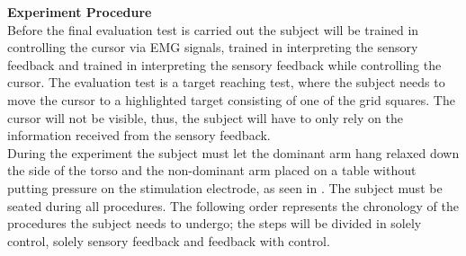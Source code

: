 \noindent\textbf{{\Large Experiment Procedure}} \\
\newline
Before the final evaluation test is carried out the subject will be trained in controlling the cursor via EMG signals, trained in interpreting the sensory feedback and trained in interpreting the sensory feedback while controlling the cursor. The evaluation test is a target reaching test, where the subject needs to move the cursor to a highlighted target consisting of one of the grid squares. The cursor will not be visible, thus, the subject will have to only rely on the information received from the sensory feedback. \\
During the experiment the subject must let the dominant arm hang relaxed down the side of the torso and the non-dominant arm placed on a table without putting pressure on the stimulation electrode, as seen in . The subject must be seated during all procedures. The following order represents the chronology of the procedures the subject needs to undergo; the steps will be divided in solely control, solely sensory feedback and feedback with control. \\



